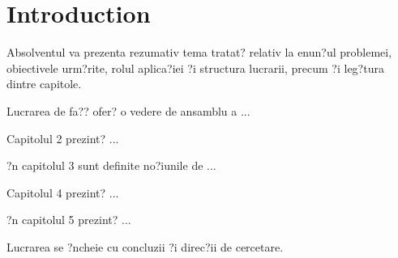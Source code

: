 \chapter*{Introduction}

Absolventul va prezenta rezumativ tema tratat? relativ la enun?ul problemei, obiectivele urm?rite, rolul aplica?iei ?i structura lucrarii, precum ?i leg?tura dintre capitole.

 
 Lucrarea de fa?? ofer? o vedere de ansamblu a ...
 
Capitolul 2 prezint? ...

?n capitolul 3 sunt definite no?iunile de ...

Capitolul 4 prezint? ...

?n capitolul 5 prezint? ...

Lucrarea se ?ncheie cu concluzii ?i direc?ii de cercetare.
